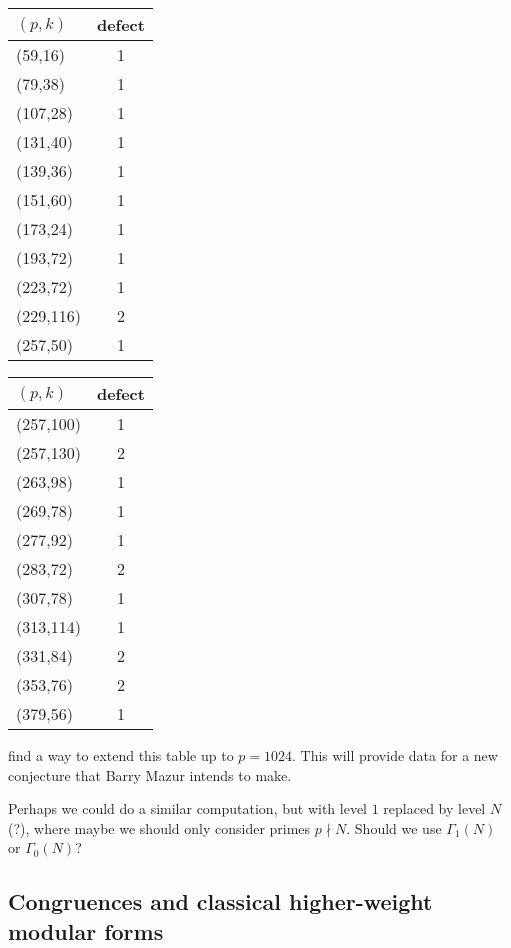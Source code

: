 \documentclass{article}
\begin{document}
\begin{center}
\begin{tabular}{|l|c|}\hline
$(p,k)$&{\bf defect}\\\hline
(59,16)&1\\
(79,38)&1\\
(107,28)&1\\
(131,40)&1\\
(139,36)&1\\
(151,60)&1\\
(173,24)&1\\
(193,72)&1\\
(223,72)&1\\
(229,116)&2\\
(257,50)&1\\
\hline\end{tabular}
\begin{tabular}{|l|c|}\hline
$(p,k)$&{\bf defect}\\\hline
(257,100)&1\\
(257,130)&2\\
(263,98)&1\\
(269,78)&1\\
(277,92)&1\\
(283,72)&2\\
(307,78)&1\\
(313,114)&1\\
(331,84)&2\\
(353,76)&2\\
(379,56)&1\\
\hline\end{tabular}
\end{center}

\vspace{1em}
 find a way to extend this table up to $p=1024$.
This will provide data for a new conjecture that Barry Mazur intends to make.



\begin{remark} Perhaps we could do a similar computation, but with level
$1$ replaced by level $N$ (?), where maybe we should only consider
primes $p\nmid N$.  Should we use $\Gamma_1(N)$ or $\Gamma_0(N)$?
\end{remark}




\subsection{Congruences and classical higher-weight modular forms}
\end{document}

